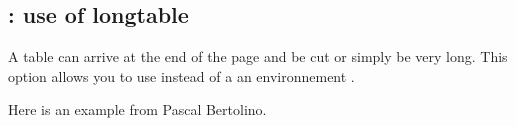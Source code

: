  \begin{alterqcm}[language=unknown]
 \end{alterqcm}
  \endgroup
 
 
\newpage
\subsection{ : use of longtable}

A table can arrive at the end of the page and be cut or simply be very long.
This option allows you to use instead of a  an environnement .


Here is an example from Pascal Bertolino.

